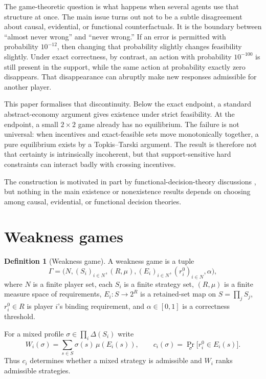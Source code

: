 \documentclass[11pt]{article}
\theoremstyle{definition}
\newtheorem{definition}[theorem]{Definition}
\newcommand{\Prob}{\Pr}
\begin{document}
The game-theoretic question is what happens when several agents use that structure at once. The main issue turns out not to be a subtle disagreement about causal, evidential, or functional counterfactuals. It is the boundary between ``almost never wrong'' and ``never wrong.'' If an error is permitted with probability $10^{-12}$, then changing that probability slightly changes feasibility slightly. Under exact correctness, by contrast, an action with probability $10^{-100}$ is still present in the support, while the same action at probability exactly zero disappears. That disappearance can abruptly make new responses admissible for another player.

This paper formalises that discontinuity. Below the exact endpoint, a standard abstract-economy argument gives existence under strict feasibility. At the endpoint, a small $2\times2$ game already has no equilibrium. The failure is not universal: when incentives and exact-feasible sets move monotonically together, a pure equilibrium exists by a Topkis--Tarski argument. The result is therefore not that certainty is intrinsically incoherent, but that support-sensitive hard constraints can interact badly with crossing incentives.

The construction is motivated in part by functional-decision-theory discussions \cite{yudkowskysoares,schwarz}, but nothing in the main existence or nonexistence results depends on choosing among causal, evidential, or functional decision theories.

\section{Weakness games}

\begin{definition}[Weakness game]
A weakness game is a tuple
\[
\Gamma=\bigl(N,(S_i)_{i\in N},(R,\mu),(E_i)_{i\in N},(r_i^0)_{i\in N},\alpha\bigr),
\]
where $N$ is a finite player set, each $S_i$ is a finite strategy set, $(R,\mu)$ is a finite measure space of requirements, $E_i:S\to 2^R$ is a retained-set map on $S=\prod_j S_j$, $r_i^0\in R$ is player $i$'s binding requirement, and $\alpha\in[0,1]$ is a correctness threshold.
\end{definition}

For a mixed profile $\sigma\in\prod_i\Delta(S_i)$ write
\[
W_i(\sigma)=\sum_{s\in S}\sigma(s)\,\mu(E_i(s)),
\qquad
c_i(\sigma)=\Prob_\sigma\bigl[r_i^0\in E_i(s)\bigr].
\]
Thus $c_i$ determines whether a mixed strategy is admissible and $W_i$ ranks admissible strategies.
\end{document}
